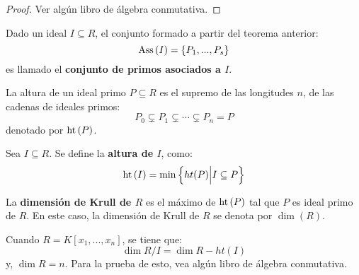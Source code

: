 \documentclass[12pt]{report}
\newcounter{it}
\theoremstyle{largebreak}
\newcommand{\Ass}[1]{\ensuremath{\textup{Ass}\left(#1\right)}}
\newcommand{\het}[1]{\ensuremath{\textup{ht}\left(#1\right)}}
\begin{document}
    \begin{proof}
        Ver algún libro de álgebra conmutativa.
    \end{proof}

    \begin{mydef}
        Dado un ideal $I\subseteq R$, el conjunto formado a partir del teorema anterior:
        \begin{equation*}
            \Ass{I}=\left\{P_1,...,P_s \right\}
        \end{equation*}
        es llamado el \textbf{conjunto de primos asociados a $I$}.
    \end{mydef}

    \begin{mydef}
        La altura de un ideal primo $P\subseteq R$ es el supremo de las longitudes $n$, de las cadenas de ideales primos:
        \begin{equation*}
            P_0\subsetneq P_1\subsetneq\cdots\subsetneq P_n=P
        \end{equation*}
        denotado por $\het{P}$.
    \end{mydef}

    \begin{mydef}
        Sea $I\subseteq R$. Se define la \textbf{altura de $I$}, como:
        \begin{equation*}
            \het{I}=\min\left\{ht(P)\Big|I\subseteq P \right\}
        \end{equation*}
    \end{mydef}

    \begin{mydef}
        La \textbf{dimensión de Krull de $R$} es el máximo de $\het{P}$ tal que $P$ es ideal primo de $R$. En este caso, la dimensión de Krull de $R$ se denota por $\dim(R)$.
    \end{mydef}

    Cuando $R=K[x_1,...,x_n]$, se tiene que:
    \begin{equation*}
        \dim R/I=\dim R-ht(I)
    \end{equation*}
    y, $\dim R=n$. Para la prueba de esto, vea algún libro de álgebra conmutativa.
\end{document}
